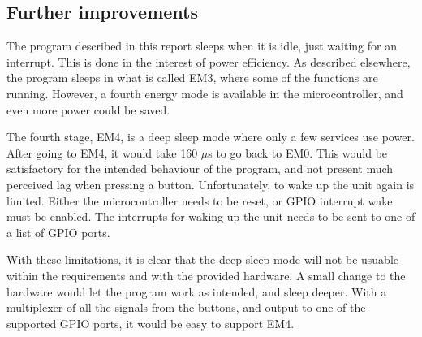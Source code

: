 \subsection{Further improvements}
The program described in this report sleeps when it is idle, just waiting for an interrupt.
This is done in the interest of power efficiency.
As described elsewhere, the program sleeps in what is called EM3, where some of the functions are running.
However, a fourth energy mode is available in the microcontroller, and even more power could be saved.

The fourth stage, EM4, is a deep sleep mode where only a few services use power.
After going to EM4, it would take 160 $\mu$s to go back to EM0.
This would be satisfactory for the intended behaviour of the program, and not present much perceived lag when pressing a button.
Unfortunately, to wake up the unit again is limited.
Either the microcontroller needs to be reset, or GPIO interrupt wake must be enabled.
The interrupts for waking up the unit needs to be sent to one of a list of GPIO ports.\cite{referencemanual}

With these limitations, it is clear that the deep sleep mode will not be usuable within the requirements and with the provided hardware.
A small change to the hardware would let the program work as intended, and sleep deeper.
With a multiplexer of all the signals from the buttons, and output to one of the supported GPIO ports, it would be easy to support EM4.
